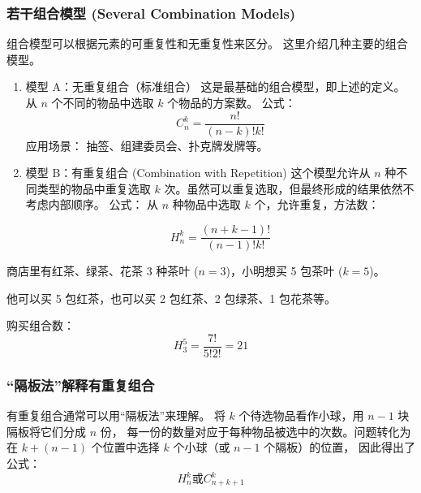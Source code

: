 \subsubsection{若干组合模型 (Several Combination Models)}
组合模型可以根据元素的可重复性和无重复性来区分。
这里介绍几种主要的组合模型。
  \begin{enumerate}
    \item 模型 A：无重复组合（标准组合）
      这是最基础的组合模型，即上述的定义。从 \(n\) 个不同的物品中选取 \(k\) 个物品的方案数。
      公式： \[C_n^k = \frac{n!}{(n-k)!k!} \]
      应用场景： 抽签、组建委员会、扑克牌发牌等。
    \item 模型 B：有重复组合 (Combination with Repetition)
      这个模型允许从 \(n\) 种不同类型的物品中重复选取 \(k\) 次。虽然可以重复选取，但最终形成的结果依然不考虑内部顺序。
      公式： 从 \(n\) 种物品中选取 \(k\) 个，允许重复，方法数：

      \[ H_n^k = \frac{(n+k-1)!}{(n-1)!k!} \]

  \end{enumerate}
  \begin{example}
    商店里有红茶、绿茶、花茶 3 种茶叶 (\(n=3\))，小明想买 5 包茶叶 (\(k=5\))。

    他可以买 5 包红茶，也可以买 2 包红茶、2 包绿茶、1 包花茶等。

    购买组合数：
    \[ H_3^5 = \frac{7!}{5!2!}=21\] 
  \end{example}

\subsubsection{“隔板法”解释有重复组合}
有重复组合通常可以用“隔板法”来理解。
将 \(k\) 个待选物品看作小球，用 \(n-1\) 块隔板将它们分成 \(n\) 份，
每一份的数量对应于每种物品被选中的次数。问题转化为在 \(k+(n-1)\) 个位置中选择 \(k\) 个小球（或 \(n-1\) 个隔板）的位置，
因此得出了公式： \[H_{n}^{k} \textit{或} C_{n+k+1}^{k}\]


